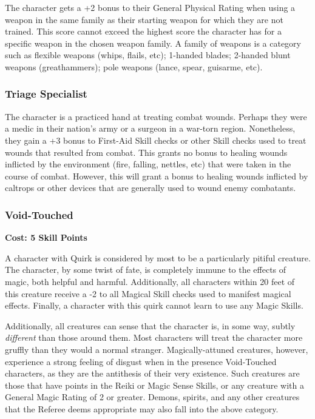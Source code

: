 \documentclass[oneside]{book}
\begin{document}
\begin{multicols}{2}
The character gets a +2 bonus to their General Physical Rating when using a weapon in the same family as their starting weapon for which they are not trained. This score cannot exceed the highest score the character has for a specific weapon in the chosen weapon family. A family of weapons is a category such as flexible weapons (whips, flails, etc); 1-handed blades; 2-handed blunt weapons (greathammers); pole weapons (lance, spear, guisarme, etc).

\subsubsection{Triage Specialist}
The character is a practiced hand at treating combat wounds. Perhaps they were a medic in their nation's army or a surgeon in a war-torn region. Nonetheless, they gain a +3 bonus to First-Aid Skill checks or other Skill checks used to treat wounds that resulted from combat. This grants no bonus to healing wounds inflicted by the environment (fire, falling, nettles, etc) that were taken in the course of combat. However, this will grant a bonus to healing wounds inflicted by caltrops or other devices that are generally used to wound enemy combatants.

\subsubsection{Void-Touched}
\textbf{\small Cost: 5 Skill Points}

A character with Quirk is considered by most to be a particularly pitiful creature. The character, by some twist of fate, is completely immune to the effects of magic, both helpful and harmful. Additionally, all characters within 20 feet of this creature receive a -2 to all Magical Skill checks used to manifest magical effects. Finally, a character with this quirk cannot learn to use any Magic Skills.

Additionally, all creatures can sense that the character is, in some way, subtly \emph{different} than those around them. Most characters will treat the character more gruffly than they would a normal stranger. Magically-attuned creatures, however, experience a strong feeling of disgust when in the presence Void-Touched characters, as they are the antithesis of their very existence. Such creatures are those that have points in the Reiki or Magic Sense Skills, or any creature with a General Magic Rating of 2 or greater. Demons, spirits, and any other creatures that the Referee deems appropriate may also fall into the above category.
\end{multicols}
\end{document}
